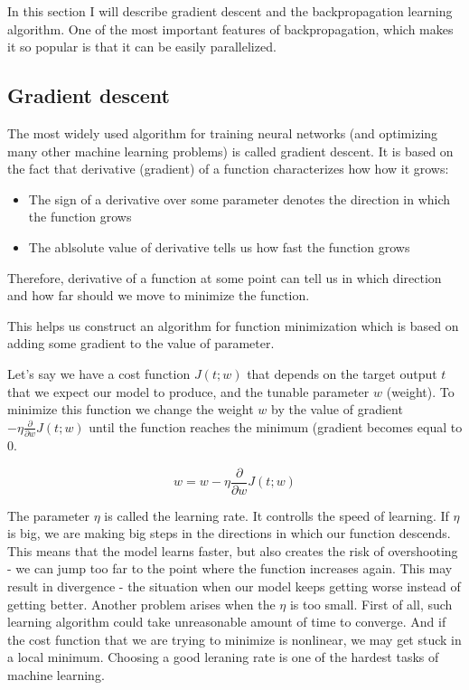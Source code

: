 In this section I will describe gradient descent and the backpropagation learning algorithm. One of the most important features of backpropagation, which makes it so popular is that it can be easily parallelized.

\subsection{Gradient descent}
The most widely used algorithm for training neural networks (and optimizing many other machine learning problems) is called gradient descent. It is based on the fact that derivative (gradient) of a function characterizes how how it grows:
\begin{itemize}
  \item The sign of a derivative over some parameter denotes the direction in which the function grows
  \item The ablsolute value of derivative tells us how fast the function grows
\end{itemize}
Therefore, derivative of a function at some point can tell us in which direction and how far should we move to minimize the function.

This helps us construct an algorithm for function minimization which is based on adding some gradient to the value of parameter.

Let's say we have a cost function $J(t;w)$ that depends on the target output $t$ that we expect our model to produce, and the tunable parameter $w$ (weight). To minimize this function we change the weight $w$ by the value of gradient $-\eta\frac{\partial}{\partial w}J(t;w)$ until the function reaches the minimum (gradient becomes equal to 0.

\begin{equation}
  w = w - \eta\frac{\partial}{\partial w}J(t;w) 
\end{equation}

The parameter $\eta$ is called the learning rate. It controlls the speed of learning. If $\eta$ is big, we are making big steps in the directions in which our function descends. This means that the model learns faster, but also creates the risk of overshooting - we can jump too far to the point where the function increases again. This may result in divergence - the situation when our model keeps getting worse instead of getting better. Another problem arises when the $\eta$ is too small. First of all, such learning algorithm could take unreasonable amount of time to converge. And if the cost function that we are trying to minimize is nonlinear, we may get stuck in a local minimum. Choosing a good leraning rate is one of the hardest tasks of machine learning.

